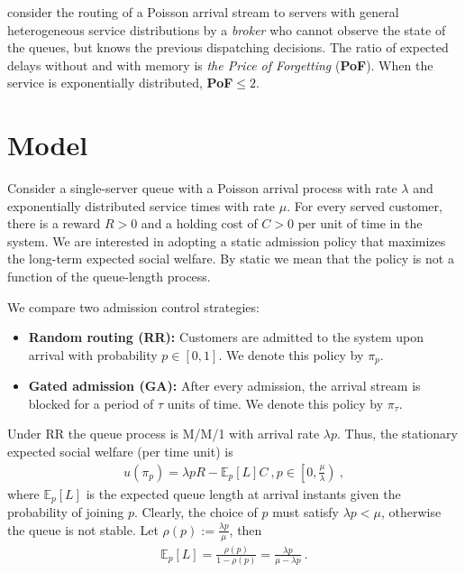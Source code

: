 \documentclass[11pt]{article}
\def\E{\mathbb{E}}
\begin{document}
\citet{AG11} consider the routing of a Poisson arrival stream to
servers with general heterogeneous service distributions
by a {\it broker} who cannot observe the state of the queues, but knows the previous
dispatching decisions. The ratio of expected delays without and with memory
is {\it the Price of Forgetting} ({\bf PoF}).
When the service is exponentially distributed, {\bf PoF}$\le2$.


\section{Model}\label{sec:model}

Consider a single-server queue with a Poisson arrival process with rate $\lambda$ and exponentially distributed service times with rate $\mu$. For every served customer, there is a reward $R>0$ and a holding cost of $C>0$ per unit of time in the system. We are interested in adopting a static admission policy that maximizes the long-term expected social welfare. By static we mean that the policy is not a function of the queue-length process.

We compare two admission control strategies:
\begin{itemize}
    \item \textbf{Random routing (RR):} Customers are admitted to the system upon arrival with probability $p\in[0,1]$. We denote this policy by $\pi_p$.
    \item \textbf{Gated admission (GA):} After every admission, the arrival stream is blocked for a period of $\tau$ units of time. We denote this policy by $\pi_\tau$. 
\end{itemize}

Under RR the queue process is M/M/1 with arrival rate $\lambda p$. Thus, the stationary expected social welfare (per time unit) is
\begin{align*}
    u(\pi_p)=\lambda p R- \E_p[L]C\ , p\in\left[0,\frac{\mu}{\lambda}\right)\ , 
\end{align*}
where $\E_p[L]$ is the expected queue length at arrival instants given the probability of joining $p$. Clearly, the choice of $p$ must satisfy $\lambda p<\mu$, otherwise the queue is not stable. Let $\rho(p):=\frac{\lambda p}{\mu}$, then  
\begin{align*}
    \E_p[L]=\frac{\rho(p)}{1-\rho(p)}=\frac{\lambda p}{\mu-\lambda p}\ .
\end{align*}
\end{document}
